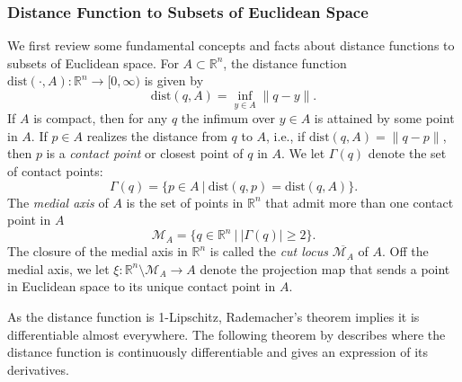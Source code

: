 \documentclass[11pt]{article}
\newcommand{\R}{\mathbb{R}}
\newcommand{\dist}{\mathrm{dist}}
\theoremstyle{plain}
\theoremstyle{definition}
\theoremstyle{remark}
\begin{document}
\subsubsection{Distance Function to Subsets of Euclidean Space}
\label{sec:Euclidean_distance_functions}
We first review some fundamental concepts and facts about distance functions to subsets of Euclidean space. For $A \subset \R^n$, the distance function $\dist(\cdot, A): \R^n \to [0, \infty)$ is given by
\begin{equation}
    \dist(q, A) = \inf_{y \in A} \| q - y \|.
\end{equation}
If $A$ is compact, then for any $q$ the infimum over $y \in A$ is attained by some point in $A$. If $p \in A$ realizes the distance from $q$ to $A$, i.e., if $\dist(q, A) = \| q - p \|$, then $p$ is a \textit{contact point} or closest point of $q$ in $A$. We let $\Gamma(q)$ denote the set
of contact points:
\[\Gamma(q) = \{ p \in A ~|~ \dist(q,p) = \dist(q,A) \}.\]
The \emph{medial axis} of $A$ is the set of points in $\R^n$ that admit more than one contact point in $A$ \citep{federer1959curvature}
\[\mathcal{M}_{A} = \{ q \in \R^n ~|~ |\Gamma(q)| \geq 2 \}.\]
The closure of the medial axis in $\R^n$ is called the \textit{cut locus} $\overline{\mathcal{M}_{A}}$ of $A$. Off the medial axis, we let $\xi: \R^n \setminus \mathcal{M}_{A} \to A$ denote the projection map that sends a point in Euclidean space to its unique contact point in $A$.

As the distance function is 1-Lipschitz, Rademacher's theorem implies it is differentiable almost everywhere. The following theorem by \cite{federer1959curvature} describes where the distance function is continuously differentiable and gives an expression of its derivatives.  
\end{document}
